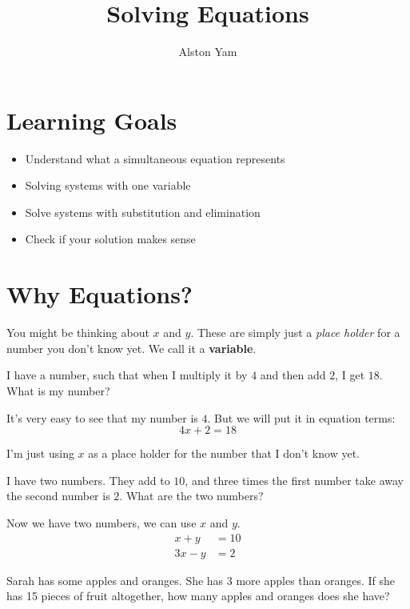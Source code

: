 \documentclass{article}
\title{Solving Equations}
\author{Alston Yam}
\date{}
\theoremstyle{mytheoremstyle}
\theoremstyle{mytheoremstyle}
\theoremstyle{myproblemstyle}
\theoremstyle{myproblemstyle}
\begin{document}
    \maketitle

    \section*{Learning Goals}
    \begin{itemize}
        \item Understand what a simultaneous equation represents
        \item Solving systems with one variable
        \item Solve systems with substitution and elimination
        \item Check if your solution makes sense    
    \end{itemize}

    \section{Why Equations?}
    You might be thinking about $x$ and $y$. These are simply just a \textit{place holder} for a number you don't know yet. We call it a \textbf{variable}.

    \begin{example}
        I have a number, such that when I multiply it by $4$ and then add $2$, I get $18$. What is my number?
    \end{example}

    It's very easy to see that my number is $4$. But we will put it in equation terms:
    \[4x + 2 = 18\]

    I'm just using $x$ as a place holder for the number that I don't know yet. 

    \begin{example}
        I have two numbers. They add to $10$, and three times the first number take away the second number is $2$. What are the two numbers?
    \end{example}
    
    Now we have two numbers, we can use $x$ and $y$.
    \begin{align*}
        x + y &= 10 \\
        3x - y &= 2
    \end{align*}

    \begin{problem}
        Sarah has some apples and oranges. She has 3 more apples than oranges. If she has 15 pieces of fruit altogether, how many apples and oranges does she have?
    \end{problem}
\end{document}
